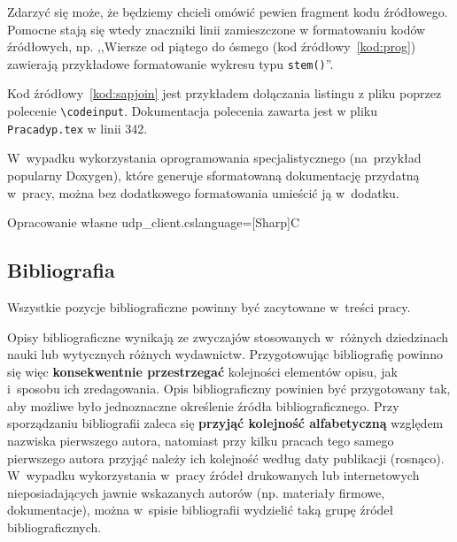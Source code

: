 \documentclass[skorowidz,skroty]{dyplomWEZUT}
\begin{document}
Zdarzyć się może, że będziemy chcieli omówić pewien fragment kodu źródłowego. Pomocne stają się wtedy znaczniki linii zamieszczone w formatowaniu kodów źródłowych, np. ,,Wiersze od piątego do ósmego (kod źródłowy~\ref{kod:prog}) zawierają przykładowe formatowanie wykresu typu \lstinline|stem()|''.

Kod źródłowy~\ref{kod:sapjoin} jest przykładem dołączania listingu z pliku poprzez polecenie \lstinline|\codeinput|. Dokumentacja polecenia zawarta jest w pliku \lstinline|Pracadyp.tex| w linii 342.

W~wypadku wykorzystania oprogramowania specjalistycznego (na~przykład popularny Doxygen), które generuje sformatowaną dokumentację przydatną w~pracy, można bez dodatkowego formatowania umieścić ją w~dodatku.

%
% 

{Opracowanie własne}{\label{kod:sapjoin}}
{udp_client.cs}{language={[Sharp]C}}

\subsection{Bibliografia}

Wszystkie pozycje bibliograficzne powinny być zacytowane w~treści pracy.

Opisy bibliograficzne wynikają ze zwyczajów stosowanych w~różnych dziedzinach nauki lub wytycznych różnych wydawnictw. Przygotowując bibliografię powinno się więc \textbf{konsekwentnie przestrzegać} kolejności elementów opisu, jak i~sposobu ich zredagowania. Opis bibliograficzny powinien być przygotowany tak, aby możliwe było jednoznaczne określenie źródła bibliograficznego. Przy sporządzaniu bibliografii zaleca się \textbf{przyjąć kolejność alfabetyczną} względem nazwiska pierwszego autora, natomiast przy kilku pracach tego samego pierwszego autora przyjąć należy ich kolejność według daty publikacji (rosnąco). W~wypadku wykorzystania w~pracy źródeł drukowanych lub internetowych nieposiadających jawnie wskazanych autorów (np. materiały firmowe, dokumentacje), można w~spisie bibliografii wydzielić taką grupę źródeł bibliograficznych.
\end{document}
